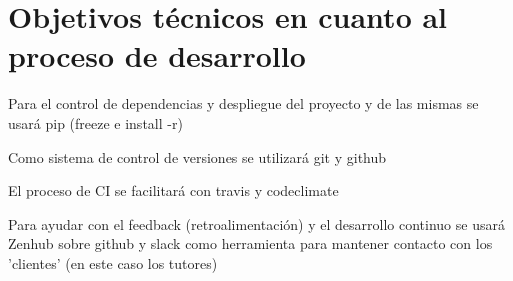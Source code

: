 \section{Objetivos técnicos en cuanto al proceso de desarrollo}
\begin{list}{-}{}
\item Para el control de dependencias y despliegue del proyecto y de las mismas se usará pip (freeze e install -r)
\item Como sistema de control de versiones se utilizará git y github
\item El proceso de CI se facilitará con travis y codeclimate
\item Para ayudar con el feedback (retroalimentación) y el desarrollo continuo se usará Zenhub sobre github y slack como herramienta para mantener contacto con los 'clientes' (en este caso los tutores)
\end{list}